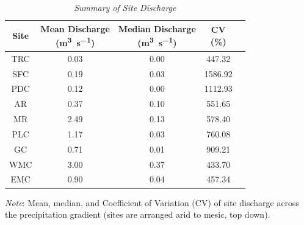 \begin{table}
\caption[Summary of Site Discharge]{\textit{Summary of Site Discharge}}
\begin{center}
\begin{tabular}[c]{ccccc}
\hline
Site & \makecell{Mean Discharge\\(\unit{\cubic\m\per\s})} & \makecell{Median Discharge\\(\unit{\cubic\m\per\s})} & \makecell{CV\\(\%)}\\
\hline
TRC & 0.03 & 0.00 & 447.32\\
SFC & 0.19 & 0.03 & 1586.92\\
PDC & 0.12 & 0.00 & 1112.93\\
AR & 0.37 & 0.10 & 551.65\\
MR & 2.49 & 0.13 & 578.40\\
PLC & 1.17 & 0.03 & 760.08\\
GC & 0.71 & 0.01 & 909.21\\
WMC & 3.00 & 0.37 & 433.70\\
EMC & 0.90 & 0.04 & 457.34\\
\hline
\end{tabular}
\end{center}
\label{tab:Q}
\textit{Note}: Mean, median, and Coefficient of Variation (CV) of site discharge across the precipitation gradient (sites are arranged arid to mesic, top down).
\end{table}

